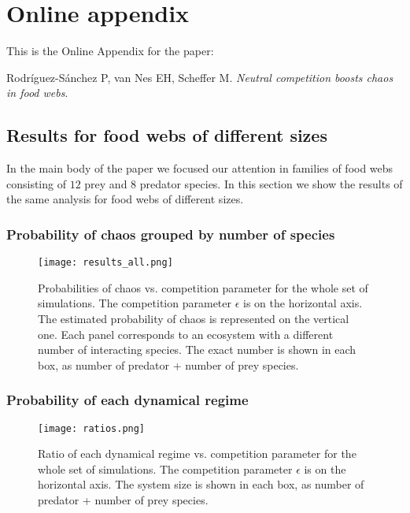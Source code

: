 \appendix
\setcounter{equation}{0}
\setcounter{figure}{0}
\renewcommand{\theequation}{A.\arabic{equation}}
\renewcommand\thefigure{A.\arabic{figure}}

\section{Online appendix}
\label{sec:Appendix}

This is the Online Appendix for the paper:

\begin{center}
Rodríguez-Sánchez P, van Nes EH, Scheffer M. \textit{Neutral competition boosts chaos in food webs}.
\end{center}

\newpage

\subsection{Results for food webs of different sizes}
\label{subsec:GeneralResults}
In the main body of the paper we focused our attention in families of food webs consisting of $12$ prey and $8$ predator species. In this section we show the results of the same analysis for food webs of different sizes.

\subsubsection{Probability of chaos grouped by number of species}
\label{subsubsec:AllProbabilities}
\begin{figure}[H]
	\begin{center}
		\texttt{[image: results\_all.png]}
	\end{center}
	\caption{Probabilities of chaos vs. competition parameter for the whole set of simulations. The competition parameter $\epsilon$ is on the horizontal axis. The estimated probability of chaos is represented on the vertical one. Each panel corresponds to an ecosystem with a different number of interacting species. The exact number is shown in each box, as number of predator + number of prey species.}
	\label{fig:AllProbabilities}
\end{figure}

\subsubsection{Probability of each dynamical regime}
\label{subsubsec:DynamicalRegimes}
\begin{figure}[H]
	\begin{center}
		\texttt{[image: ratios.png]}
	\end{center}
	\caption{Ratio of each dynamical regime vs. competition parameter for the whole set of simulations. The competition parameter $\epsilon$ is on the horizontal axis. The system size is shown in each box, as number of predator + number of prey species.}
	\label{fig:DynamicalRegimes}
\end{figure}

